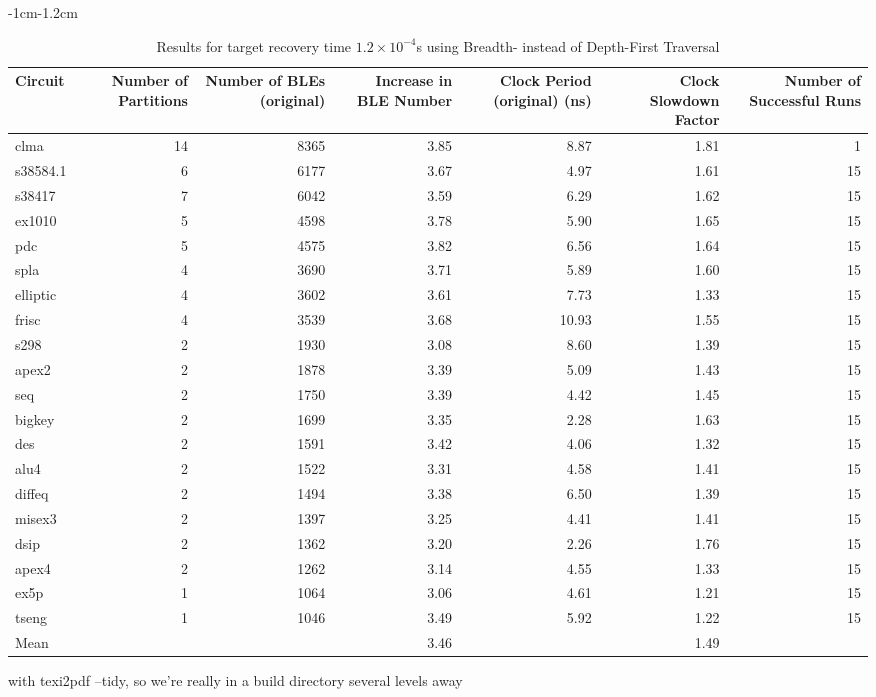 \documentclass[12pt,final,oneside]{dwThesis} %
\begin{document}
   \begin{table}
      \footnotesize 
      \begin{adjustwidth}
         {-1cm}{-1.2cm}

         \begin{tabularx}
            {1.1\textwidth}{lRRRRRR}
            \toprule
 Circuit & Number of Partitions &  Number of BLEs (original) &  Increase in BLE Number &  Clock Period (original) (ns) &  Clock Slowdown Factor &  Number of Successful Runs\\
            \midrule
clma & 14 & 8365 & 3.85 & 8.87 & 1.81 & 1\\
s38584.1 & 6 & 6177 & 3.67 & 4.97 & 1.61 & 15\\
s38417 & 7 & 6042 & 3.59 & 6.29 & 1.62 & 15\\
ex1010 & 5 & 4598 & 3.78 & 5.90 & 1.65 & 15\\
pdc & 5 & 4575 & 3.82 & 6.56 & 1.64 & 15\\
spla & 4 & 3690 & 3.71 & 5.89 & 1.60 & 15\\
elliptic & 4 & 3602 & 3.61 & 7.73 & 1.33 & 15\\
frisc & 4 & 3539 & 3.68 & 10.93 & 1.55 & 15\\
s298 & 2 & 1930 & 3.08 & 8.60 & 1.39 & 15\\
apex2 & 2 & 1878 & 3.39 & 5.09 & 1.43 & 15\\
seq & 2 & 1750 & 3.39 & 4.42 & 1.45 & 15\\
bigkey & 2 & 1699 & 3.35 & 2.28 & 1.63 & 15\\
des & 2 & 1591 & 3.42 & 4.06 & 1.32 & 15\\
alu4 & 2 & 1522 & 3.31 & 4.58 & 1.41 & 15\\
diffeq & 2 & 1494 & 3.38 & 6.50 & 1.39 & 15\\
misex3 & 2 & 1397 & 3.25 & 4.41 & 1.41 & 15\\
dsip & 2 & 1362 & 3.20 & 2.26 & 1.76 & 15\\
apex4 & 2 & 1262 & 3.14 & 4.55 & 1.33 & 15\\
ex5p & 1 & 1064 & 3.06 & 4.61 & 1.21 & 15\\
tseng & 1 & 1046 & 3.49 & 5.92 & 1.22 & 15\\
Mean &  &  & 3.46  &  & 1.49 & \\
\bottomrule

         \end{tabularx}
         \caption{Results for target recovery time
            $1.2\times10^{-4}$s using Breadth- instead of Depth-First Traversal}
         \label{Results1.2e-4BFS} 
      \end{adjustwidth}

   \end{table}


   with texi2pdf --tidy, so we're really in a build directory several levels
   away

\end{document}
